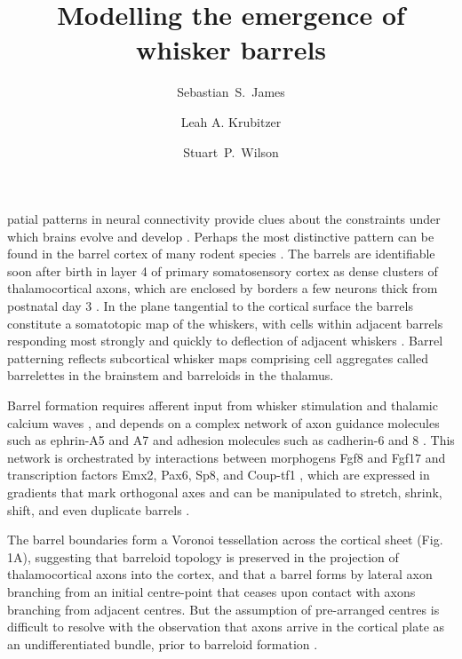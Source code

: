 \documentclass[9pt,twocolumn,twoside,lineno]{pnas-new}
\title{Modelling the emergence of whisker barrels}
\author[a,1]{Sebastian~S.~James}
\author[b]{Leah A. Krubitzer}
\author[a]{Stuart~P.~Wilson}
\affil[a]{Department of Psychology, The University of Sheffield, Sheffield, United Kingdom.}
\affil[b]{Center for Neuroscience, The University of California, Davis, United States.}
\begin{document}
\newcommand{\cmnt}[1]{\textcolor{blue}{#1}}
\newcommand{\dvrg}{\nabla\vcdot\nabla}
\newcommand{\e}{\emph}
\newcommand{\bol}{\textbf}
\newcommand{\mb}[1]{\mathbf{#1}}
\makeatletter
\newcommand*\vcdot{\mathpalette\vcdot@{.35}}
\newcommand*\vcdot@[2]{\mathbin{\vcenter{\hbox{\scalebox{#2}{$\m@th#1\bullet$}}}}}
\makeatother

\maketitle
\thispagestyle{firststyle}

\modulolinenumbers{}
\linenumbers

patial patterns in neural connectivity provide clues about the constraints under which brains evolve and develop \citep{purves_iterated_1992}. Perhaps the most distinctive pattern can be found in the barrel cortex of many rodent species \cite{woolsey_structural_1970}. The barrels are identifiable soon after birth in layer 4 of primary somatosensory cortex as dense clusters of thalamocortical axons, which are enclosed by borders a few neurons thick from postnatal day 3 \citep{erzurumlu_development_2012}. In the plane tangential to the cortical surface the barrels constitute a somatotopic map of the whiskers, with cells within adjacent barrels responding most strongly and quickly to deflection of adjacent whiskers \citep{armstrong-james_flow_1992}. Barrel patterning reflects subcortical whisker maps comprising cell aggregates called barrelettes in the brainstem and barreloids in the thalamus.

Barrel formation requires afferent input from whisker stimulation and thalamic calcium waves \citep{anton-bolanos_prenatal_2019}, and depends on a complex network of axon guidance molecules such as ephrin-A5 and A7 and adhesion molecules such as cadherin-6 and 8 \citep{vanderhaeghen_mapping_2000,miller_epha7-ephrin-a5_2006}.
This network is orchestrated by interactions between morphogens Fgf8 and Fgf17 and transcription factors Emx2, Pax6, Sp8, and Coup-tf1 \citep{shimogori_fibroblast_2005}, which are expressed in gradients that mark orthogonal axes and can be manipulated to stretch, shrink, shift, and even duplicate barrels \cite{assimacopoulos_fibroblast_2012}.

The barrel boundaries form a Voronoi tessellation across the cortical sheet \citep{senft_mouse_1991} (Fig.\,1A), suggesting that barreloid topology is preserved in the projection of thalamocortical axons into the cortex, and that a barrel forms by lateral axon branching from an initial centre-point that ceases upon contact with axons branching from adjacent centres. But the assumption of pre-arranged centres is difficult to resolve with the observation that axons arrive in the cortical plate as an undifferentiated bundle, prior to barreloid formation \cite{agmon_organized_1993}.
\end{document}
